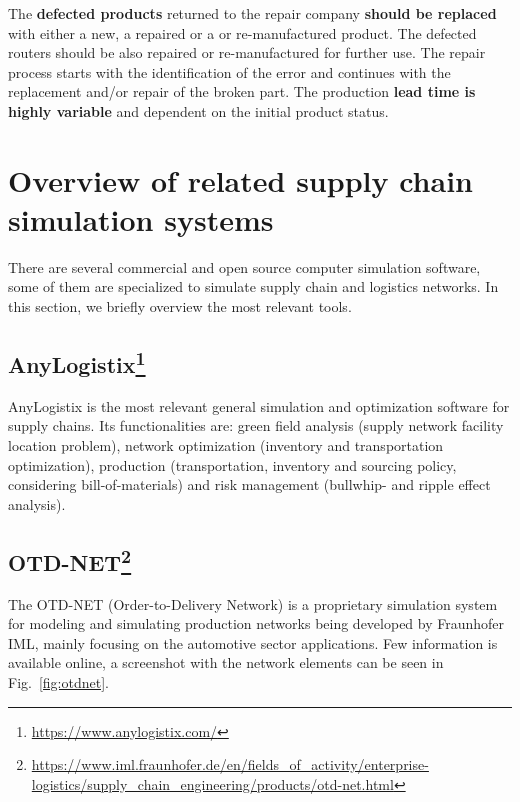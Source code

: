 \documentclass{article}
\begin{document}
The \textbf{defected products} returned to the repair company \textbf{should be replaced} with either a new, a repaired or a or re-manufactured product. The defected routers should be also repaired or re-manufactured for further use. The repair process starts with the identification of the error and continues with the replacement and/or repair of the broken part. The production \textbf{lead time is highly variable} and dependent on the initial product status.


\section{Overview of related supply chain simulation systems}

There are several commercial and open source computer simulation software, some of them are specialized to simulate supply chain and logistics networks. In this section, we briefly overview the most relevant tools.


\subsection[AnyLogistix]{AnyLogistix\protect\footnote{\href{https://www.anylogistix.com/}{https://www.anylogistix.com/}}}

AnyLogistix is the most relevant general simulation and optimization software for supply chains. Its functionalities are: green field analysis (supply network facility location problem), network optimization (inventory and transportation optimization), production (transportation, inventory and sourcing policy, considering bill-of-materials) and risk management (bullwhip- and ripple effect analysis).


\subsection[OTD-NET]{OTD-NET\protect\footnote{\href{https://www.iml.fraunhofer.de/en/fields_of_activity/enterprise-logistics/supply\_chain_engineering/products/otd-net.html}{https://www.iml.fraunhofer.de/en/fields\_of\_activity/enterprise-logistics/supply\_chain\_engineering/products/otd-net.html}}}

The OTD-NET (Order-to-Delivery Network) is a proprietary simulation system for modeling and simulating production networks being developed by Fraunhofer IML, mainly focusing on the automotive sector applications. Few information is available online, a screenshot with the network elements can be seen in Fig.~\ref{fig:otdnet}.
\end{document}
